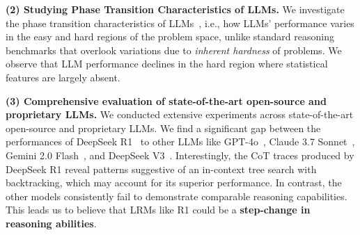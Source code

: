 \documentclass{article} %
\begin{document}
\textbf{(2) Studying Phase Transition Characteristics of LLMs.} We investigate the phase transition characteristics of LLMs~\citep{where_the_hard_problems_are}, i.e., how LLMs' performance varies in the easy and hard regions of the problem space, unlike standard reasoning benchmarks that overlook variations due to \emph{inherent hardness} of problems. We observe that LLM performance declines in the hard region where statistical features are largely absent.

\textbf{(3) Comprehensive evaluation of state-of-the-art open-source and proprietary LLMs.} We conducted extensive experiments across state-of-the-art open-source and proprietary LLMs. We find a significant gap between the performances of DeepSeek R1~\citep{deepseek_r1} to other LLMs like GPT-4o~\citep{gpt_4o}, Claude 3.7 Sonnet~\citep{claude_37_sonnet}, Gemini 2.0 Flash~\citep{gemini_20_flash}, and DeepSeek V3~\citep{deepseek_v3}. Interestingly, the CoT traces produced by DeepSeek R1 reveal patterns suggestive of an in-context tree search with backtracking, which may account for its superior performance. In contrast, the other models consistently fail to demonstrate comparable reasoning capabilities. This leads us to believe that LRMs like R1 could be a \textbf{step-change in reasoning abilities}. 






\end{document}
